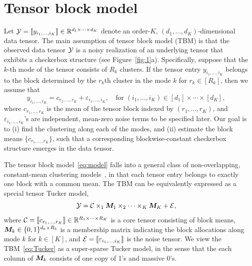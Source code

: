 \documentclass[11pt]{article}
\theoremstyle{plain}
\theoremstyle{definition}
\begin{document}
\section{Tensor block model}

Let $\mathcal{Y}=\llbracket y_{i_1,\ldots,i_K} \rrbracket\in\mathbb{R}^{d_1\times \cdots\times d_K}$ denote an order-$K$, $(d_1,\ldots,d_K)$-dimensional data tensor. The main assumption of tensor block model (TBM) is that the observed data tensor $\mathcal{Y}$ is a noisy realization of an underlying tensor that exhibits a checkerbox structure (see Figure~\ref{fig:1}a). Specifically, suppose that the $k$-th mode of the tensor consists of $R_k$ clusters. If the tensor entry $y_{i_1,\ldots,i_K}$ belongs to the block determined by the $r_k$th cluster in the mode $k$ for $r_k\in[R_k]$, then we assume that 
\begin{equation}\label{eq:model}
y_{i_1,\ldots,i_K}=c_{r_1,\ldots,r_K}+\varepsilon_{i_1,\ldots,i_K},\quad \text{for }(i_1,\ldots,i_K)\in[d_1]\times\cdots\times [d_K],
\end{equation}
where $c_{r_1,\ldots,r_K}$ is the mean of the tensor block indexed by $(r_1,\ldots,r_K)$,  and $\varepsilon_{i_1,\ldots,i_K}$'s are independent, mean-zero noise terms to be specified later. Our goal is to (i) find the clustering along each of the modes, and (ii) estimate the block means $\{c_{r_1,\ldots,r_K}\}$, such that a corresponding blockwise-constant checkerbox structure emerges in the data tensor. 

The tensor block model~\eqref{eq:model} falls into a general class of non-overlapping, constant-mean clustering models~\cite{madeira2004biclustering}, in that each tensor entry belongs to exactly one block with a common mean. The TBM can be equivalently expressed as a special tensor Tucker model,
\begin{equation}\label{eq:Tucker}
\mathcal{Y}=\mathcal{C}\times_1\bm M_1\times_2\cdots \times_K \bm M_K+\mathcal{E},
\end{equation}
where $\mathcal{C}=\llbracket c_{r_1,\ldots,r_K} \rrbracket\in\mathbb{R}^{R_1\times\cdots\times R_K}$ is a core tensor consisting of block means, $\bm M_k \in\{0,1\}^{d_k\times R_k}$ is a membership matrix indicating the block allocations along mode $k$ for $k\in[K]$, and $\mathcal{E}=\llbracket \varepsilon_{i_1,\ldots,i_K} \rrbracket$ is the noise tensor. %
We view the TBM~\eqref{eq:Tucker} as a super-sparse Tucker model, in the sense that the each column of $\bm M_k$ consists of one copy of 1's and massive 0's. 
\end{document}
